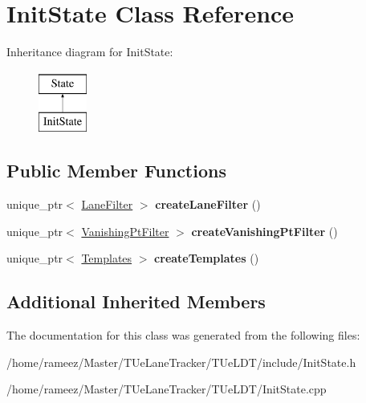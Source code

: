 \hypertarget{classInitState}{\section{Init\-State Class Reference}
\label{classInitState}
}
Inheritance diagram for Init\-State\-:\begin{figure}[H]
\begin{center}
\leavevmode
\includegraphics[height=2.000000cm]{classInitState}
\end{center}
\end{figure}
\subsection*{Public Member Functions}
\begin{DoxyCompactItemize}
\item 
\hypertarget{classInitState_a66440894e367dca8890e64a12e013d46}{unique\-\_\-ptr$<$ \hyperlink{classLaneFilter}{Lane\-Filter} $>$ {\bfseries create\-Lane\-Filter} ()}\label{classInitState_a66440894e367dca8890e64a12e013d46}

\item 
\hypertarget{classInitState_af6fb8aac76c287ba445c330b4ba96d17}{unique\-\_\-ptr$<$ \hyperlink{classVanishingPtFilter}{Vanishing\-Pt\-Filter} $>$ {\bfseries create\-Vanishing\-Pt\-Filter} ()}\label{classInitState_af6fb8aac76c287ba445c330b4ba96d17}

\item 
\hypertarget{classInitState_a4c85c3a5f03cc1591762985272ac4544}{unique\-\_\-ptr$<$ \hyperlink{structTemplates}{Templates} $>$ {\bfseries create\-Templates} ()}\label{classInitState_a4c85c3a5f03cc1591762985272ac4544}

\end{DoxyCompactItemize}
\subsection*{Additional Inherited Members}


The documentation for this class was generated from the following files\-:\begin{DoxyCompactItemize}
\item 
/home/rameez/\-Master/\-T\-Ue\-Lane\-Tracker/\-T\-Ue\-L\-D\-T/include/Init\-State.\-h\item 
/home/rameez/\-Master/\-T\-Ue\-Lane\-Tracker/\-T\-Ue\-L\-D\-T/Init\-State.\-cpp\end{DoxyCompactItemize}
